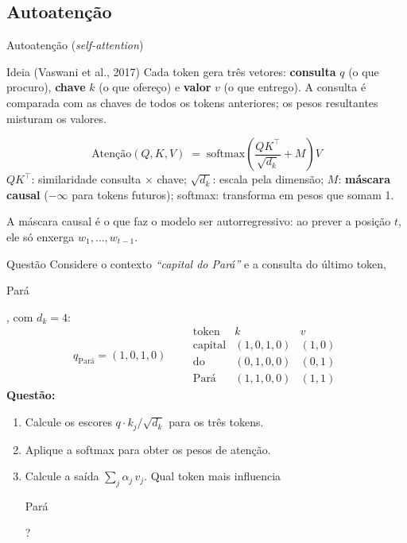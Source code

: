 \documentclass[aspectratio=169]{beamer}
\newcommand{\tk}[1]{{\setlength{\fboxsep}{1.6pt}\colorbox{mineblue!12}{\strut\ttfamily\footnotesize #1}}}
\begin{document}
\subsection{Autoatenção}
\begin{frame}{Autoatenção (\textit{self-attention})}
    \begin{block}{Ideia (Vaswani et al., 2017)}
        \footnotesize Cada token gera três vetores: \textbf{consulta} $q$ (o que procuro), \textbf{chave} $k$ (o que ofereço) e \textbf{valor} $v$ (o que entrego). A consulta é comparada com as chaves de todos os tokens anteriores; os pesos resultantes misturam os valores.
    \end{block}
    \pause
    \[
      \text{Atenção}(Q,K,V) \;=\; \text{softmax}\!\left(\frac{QK^{\top}}{\sqrt{d_k}} + M\right) V
    \]
    \footnotesize $QK^\top$: similaridade consulta $\times$ chave; $\sqrt{d_k}$: escala pela dimensão; $M$: \textbf{máscara causal} ($-\infty$ para tokens futuros); softmax: transforma em pesos que somam 1.
    \pause
    \begin{alertblock}{}
        \footnotesize A máscara causal é o que faz o modelo ser autorregressivo: ao prever a posição $t$, ele só enxerga $w_1,\dots,w_{t-1}$.
    \end{alertblock}
\end{frame}

\begin{frame}{Questão}
    \footnotesize
    Considere o contexto \textit{``capital do Pará''} e a consulta do último token, \tk{Pará}, com $d_k = 4$:
    \[
      q_{\text{Pará}} = (1,0,1,0)
      \qquad
      \begin{array}{l|c|c}
         \text{token} & k & v \\ \hline
         \text{capital} & (1,0,1,0) & (1,0) \\
         \text{do}      & (0,1,0,0) & (0,1) \\
         \text{Pará}    & (1,1,0,0) & (1,1)
      \end{array}
    \]
    \textbf{Questão:}
    \begin{enumerate}
        \item Calcule os escores $q \cdot k_j / \sqrt{d_k}$ para os três tokens.
        \item Aplique a softmax para obter os pesos de atenção.
        \item Calcule a saída $\sum_j \alpha_j\, v_j$. Qual token mais influencia \tk{Pará}?
    \end{enumerate}
\end{frame}
\end{document}
